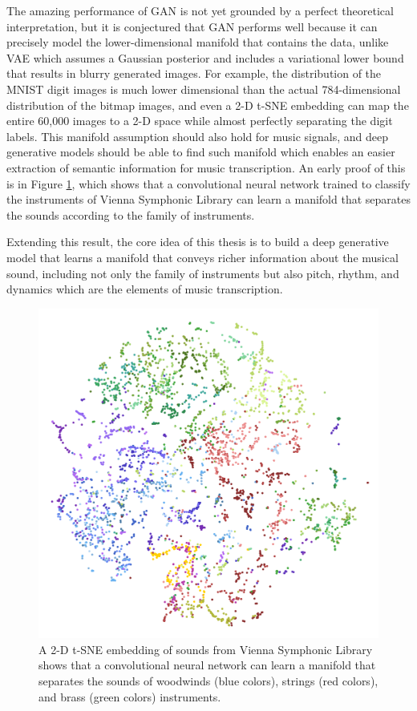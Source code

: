 The amazing performance of GAN is not yet grounded by a perfect theoretical interpretation, but it is conjectured that GAN performs well because it can precisely model the lower-dimensional manifold that contains the data, unlike VAE which assumes a Gaussian posterior and includes a variational lower bound that results in blurry generated images.
For example, the distribution of the MNIST digit images \cite{lecun1998mnist} is much lower dimensional than the actual 784-dimensional distribution of the bitmap images, and even a 2-D t-SNE embedding \cite{maaten2008tsne} can map the entire 60,000 images to a 2-D space while almost perfectly separating the digit labels.
This manifold assumption should also hold for music signals, and deep generative models should be able to find such manifold which enables an easier extraction of semantic information for music transcription.
An early proof of this is in Figure \ref{fig:tsne}, which shows that a convolutional neural network trained to classify the instruments of Vienna Symphonic Library can learn a manifold that separates the sounds according to the family of instruments.

Extending this result, the core idea of this thesis is to build a deep generative model that learns a manifold that conveys richer information about the musical sound, including not only the family of instruments but also pitch, rhythm, and dynamics which are the elements of music transcription.

\begin{figure}
	\centering
	\includegraphics[width=\textwidth]{instruments-tsne.png}
	\caption{A 2-D t-SNE embedding of sounds from Vienna Symphonic Library shows that a convolutional neural network can learn a manifold that separates the sounds of woodwinds (blue colors), strings (red colors), and brass (green colors) instruments.}\label{fig:tsne}
\end{figure}




